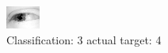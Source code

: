 \begin{figure}[h!]
\begin{center}
\includegraphics[width=0.60\columnwidth]{figures/ID2508_class_3_target_4.png}
\end{center}
\caption{ Classification: 3 actual target: 4}
\label{fig:ID2508_class_3_target_4}
\end{figure}

